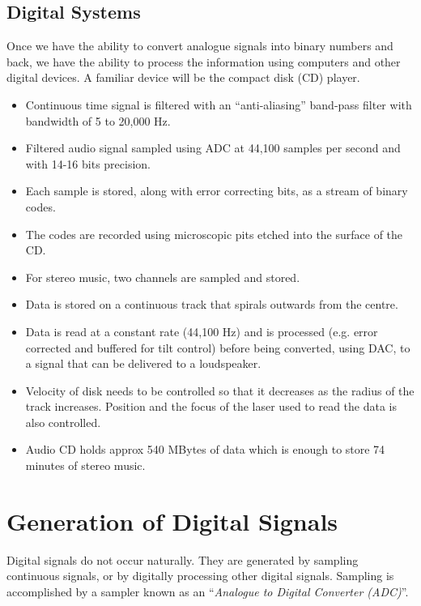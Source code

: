 \subsection*{Digital Systems}

Once we have the ability to convert analogue signals into binary
numbers and back, we have the ability to process the information using
computers and other digital devices. A familiar device will be the
compact disk (CD) player.

\begin{slide}\label{slide:CD1}
\begin{itemize}
\item Continuous time signal is filtered with an ``anti-aliasing''
  band-pass filter with bandwidth of 5 to 20,000 Hz.
\item Filtered audio signal sampled using ADC at 44,100 samples per second and
  with 14-16 bits precision. 
\item Each sample is stored, along with error
  correcting bits, as a stream of binary codes. 
\item The codes are recorded using microscopic pits etched into the surface of the CD.
\end{itemize}
\end{slide}

\begin{slide}\label{slide:CD2}
\begin{itemize}
\item For stereo music, two channels are sampled and stored.
\item Data is stored on a continuous track that spirals outwards from
  the centre.
\item Data is read at a constant rate (44,100 Hz) and is processed (e.g.
  error corrected and buffered for tilt control) before being
  converted, using DAC, to a signal that can be delivered to a
  loudspeaker.
\item Velocity of disk needs to be controlled so that it decreases as
  the radius of the track increases. Position and the focus of the laser used to read the data is
  also controlled.
\item Audio CD holds approx 540 MBytes of data which is enough to
  store 74 minutes of stereo music.
\end{itemize}
\end{slide}


\section*{Generation of Digital Signals}
Digital signals do not occur naturally. They are generated by
sampling continuous signals, or by digitally processing other
digital signals. Sampling is accomplished by a sampler known as an
``\emph{Analogue to Digital Converter (ADC)}''.

